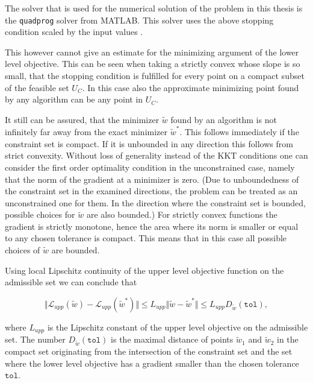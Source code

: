 The solver that is used for the numerical solution of the problem in this thesis is the \texttt{quadprog} solver from MATLAB. This solver uses the above stopping condition scaled by the input values \cite{2017}.

This  however cannot give an estimate for the minimizing argument of the lower level objective.
This can be seen when taking a strictly convex whose slope is so small, that the stopping condition is fulfilled for every point on a compact subset of the feasible set \(U_C\).
In this case also the approximate minimizing point found by any algorithm can be any point in \(U_C\). 

It still can be assured, that the minimizer \(\tilde{w}\) found by an algorithm is not infinitely far away from the exact minimizer \(\tilde{w}^*\).
This follows immediately if the constraint set is compact. If it is unbounded in any direction this follows from strict convexity.
Without loss of generality instead of the KKT conditions one can consider the first order optimality condition in the unconstrained case, namely that the norm of the gradient at a minimizer is zero. (Due to unboundedness of the constraint set in the examined directions, the problem can be treated as an unconstrained one for them. In the direction where the constraint set is bounded, possible choices for \(\tilde{w}\) are also bounded.)
For strictly convex functions the gradient is strictly monotone, hence the area where its norm is smaller or equal to any chosen tolerance is compact. This means that in this case all possible choices of \(\tilde{w}\) are bounded.

Using local Lipschitz continuity of the upper level objective function on the admissible set we can conclude that

\[ \Vert \mathcal{L}_{upp}(\tilde{w})-\mathcal{L}_{upp}(\tilde{w}^*) \Vert \leq L_{upp}\Vert \tilde{w}-\tilde{w}^* \Vert \leq  L_{upp} D_{\tilde{w}}(\mathtt{tol}), \]

where \(  L_{upp}\) is the Lipschitz constant of the upper level objective on the admissible set. The number \(D_{\tilde{w}}(\mathtt{tol})\) is the maximal distance of points \(\tilde{w}_1\) and \(\tilde{w}_2\) in the compact set originating from the intersection of the constraint set and the set where the lower level objective has a gradient smaller than the chosen tolerance \(\mathtt{tol}\). 
%
%

